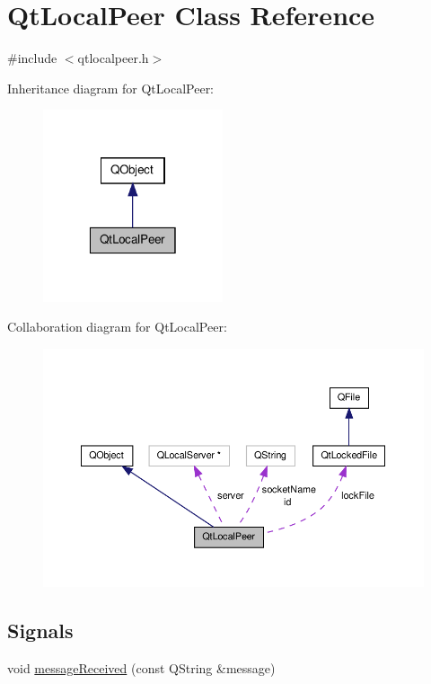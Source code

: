 \hypertarget{class_qt_local_peer}{\section{Qt\-Local\-Peer Class Reference}
\label{class_qt_local_peer}
}


{\ttfamily \#include $<$qtlocalpeer.\-h$>$}



Inheritance diagram for Qt\-Local\-Peer\-:\nopagebreak
\begin{figure}[H]
\begin{center}
\leavevmode
\includegraphics[width=150pt]{class_qt_local_peer__inherit__graph}
\end{center}
\end{figure}


Collaboration diagram for Qt\-Local\-Peer\-:\nopagebreak
\begin{figure}[H]
\begin{center}
\leavevmode
\includegraphics[width=350pt]{class_qt_local_peer__coll__graph}
\end{center}
\end{figure}
\subsection*{Signals}
\begin{DoxyCompactItemize}
\item 
void \hyperlink{class_qt_local_peer_a4436ad976edb6f177de1300b5aab9bfe}{message\-Received} (const Q\-String \&message)
\end{DoxyCompactItemize}
